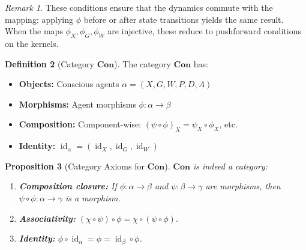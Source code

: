 \documentclass[11pt,a4paper]{article}
\theoremstyle{definition}
\newtheorem{definition}{Definition}[section]
\theoremstyle{plain}
\newtheorem{proposition}[definition]{Proposition}
\theoremstyle{remark}
\newtheorem{remark}[definition]{Remark}
\newcommand{\Con}{\mathbf{Con}}
\DeclareMathOperator{\id}{id}
\begin{document}
\begin{remark}
These conditions ensure that the dynamics commute with the mapping: applying $\phi$ before or after state transitions yields the same result. When the maps $\phi_X, \phi_G, \phi_W$ are injective, these reduce to pushforward conditions on the kernels.
\end{remark}

\begin{definition}[Category $\Con$]
The category $\Con$ has:
\begin{itemize}
    \item \textbf{Objects:} Conscious agents $\alpha = (X, G, W, P, D, A)$
    \item \textbf{Morphisms:} Agent morphisms $\phi: \alpha \to \beta$
    \item \textbf{Composition:} Component-wise: $(\psi \circ \phi)_X = \psi_X \circ \phi_X$, etc.
    \item \textbf{Identity:} $\id_\alpha = (\id_X, \id_G, \id_W)$
\end{itemize}
\end{definition}

\begin{proposition}[Category Axioms for $\Con$]\label{prop:con-category}
$\Con$ is indeed a category:
\begin{enumerate}[label=(\roman*)]
    \item \textbf{Composition closure:} If $\phi: \alpha \to \beta$ and $\psi: \beta \to \gamma$ are morphisms, then $\psi \circ \phi: \alpha \to \gamma$ is a morphism.
    \item \textbf{Associativity:} $(\chi \circ \psi) \circ \phi = \chi \circ (\psi \circ \phi)$.
    \item \textbf{Identity:} $\phi \circ \id_\alpha = \phi = \id_\beta \circ \phi$.
\end{enumerate}
\end{proposition}
\end{document}
